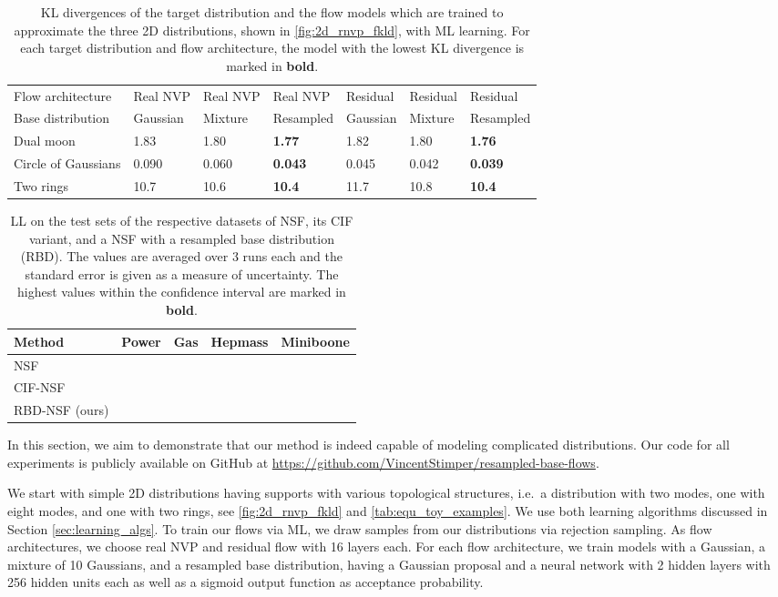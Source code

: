 \documentclass[twoside]{article}
\begin{document}
\begin{table*}[h!]
  \caption{KL divergences of the target distribution and the flow models which are trained to approximate the three 2D distributions, shown in \autoref{fig:2d_rnvp_fkld}, with ML learning. For each target distribution and flow architecture, the model with the lowest KL divergence is marked in \textbf{bold}.}
  \label{tab:2d_fkld_kld}
  \centering
  \vspace{0.3cm}
  \begin{tabular}{l|lll|lll}
    Flow architecture & Real NVP & Real NVP & Real NVP & Residual & Residual & Residual \\
    Base distribution & Gaussian & Mixture & Resampled & Gaussian & Mixture & Resampled \\
    \hline 
    Dual moon & 1.83 & 1.80 & \textbf{1.77} & 1.82 & 1.80 & \textbf{1.76} \\
    Circle of Gaussians & 0.090 & 0.060 & \textbf{0.043} & 0.045 & 0.042 & \textbf{0.039} \\
    Two rings & 10.7 & 10.6 & \textbf{10.4} & 11.7 & 10.8 & \textbf{10.4}
  \end{tabular}
\end{table*}

\begin{table*}[t]
  \caption{LL on the test sets of the respective datasets of NSF, its CIF variant, and a NSF with a resampled base distribution (RBD). The values are averaged over 3 runs each and the standard error is given as a measure of uncertainty. The highest values within the confidence interval are marked in \textbf{bold}.}
  \label{tab:uci_ll}
  \centering
  \vspace{0.3cm}
  \begin{tabular}{l|llll}
    Method & Power & Gas & Hepmass & Miniboone \\
    \hline
    NSF &  &  &  &  \\
    CIF-NSF &  &  &  &  \\
    RBD-NSF (ours) &  &  &  & 
  \end{tabular}
\end{table*}

In this section, we aim to demonstrate that our method is indeed capable of modeling complicated distributions. Our code for all experiments is publicly available on GitHub at \url{https://github.com/VincentStimper/resampled-base-flows}.

We start with simple 2D distributions having supports with various topological structures, i.e.\ a distribution with two modes, one with eight modes, and one with two rings, see \autoref{fig:2d_rnvp_fkld} and \autoref{tab:equ_toy_examples}. We use both learning algorithms discussed in Section \ref{sec:learning_algs}. To train our flows via ML, we draw samples from our distributions via rejection sampling. As flow architectures, we choose real NVP \citep{Dinh2017} and residual flow \citep{Behrmann2019,Chen2019a} with 16 layers each. For each flow architecture, we train models with a Gaussian, a mixture of 10 Gaussians, and a resampled base distribution, having a Gaussian proposal and a neural network with 2 hidden layers with 256 hidden units each as well as a sigmoid output function as acceptance probability. 
\end{document}
